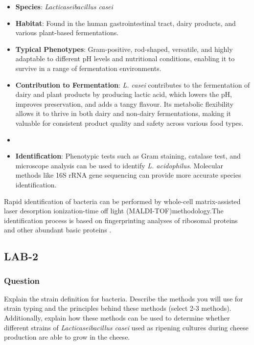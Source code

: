 \begin{itemize}
    \item \textbf{Species}: \textit{Lacticaseibacillus casei}
    \item \textbf{Habitat}: Found in the human gastrointestinal tract, dairy products, and various plant-based fermentations.
    \item \textbf{Typical Phenotypes}: Gram-positive, rod-shaped, versatile, and highly adaptable to different pH levels and nutritional conditions, enabling it to survive in a range of fermentation environments.
    \item \textbf{Contribution to Fermentation}: \textit{L. casei} contributes to the fermentation of dairy and plant products by producing lactic acid, which lowers the pH, improves preservation, and adds a tangy flavour. Its metabolic flexibility allows it to thrive in both dairy and non-dairy fermentations, making it valuable for consistent product quality and safety across various food types.
    \item \item \textbf{Identification}: Phenotypic tests such as Gram staining, catalase test, and microscope analysis can be used to identify \textit{L. acidophilus}. Molecular methods like 16S rRNA gene sequencing can provide more accurate species identification.
\end{itemize}

\vspace*{0.5em}
Rapid identification of bacteria can be performed by whole-cell matrix-assisted laser desorption ionization-time off light (MALDI-TOF)methodology.The identification process is based on fingerprinting analyses of ribosomal proteins and other abundant basic proteins \cite*{L9-Coryn}.

\subsection{LAB-2}
\subsubsection*{Question}
Explain the strain definition for bacteria. Describe the methods you will use for strain typing and the principles behind these methods (select 2-3 methods). Additionally, explain how these methods can be used to determine whether different strains of \textit{Lacticaseibacillus casei} used as ripening cultures during cheese production are able to grow in the cheese.


